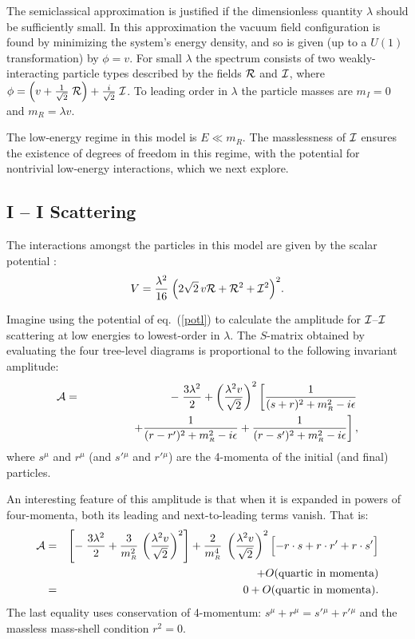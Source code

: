 \documentclass[12pt]{article}
\def\sst{\scriptscriptstyle}
\def\pref#1{(\ref{#1})}
\def\eps{\epsilon}
\def\nth#1{\frac{1}{#1}}
\begin{document}
The semiclassical approximation is justified if the dimensionless 
quantity $\lambda$ should be sufficiently small. In this approximation
the vacuum field configuration is found by minimizing the system's 
energy density, and so is given (up to a $U(1)$ transformation)
by $\phi = v$. 
For small $\lambda$ the spectrum consists of two weakly-interacting
particle types described by the fields ${\cal R}$ and ${\cal I}$,
where $\phi = \left( v + \nth{\sqrt2} \; {\cal R} \right) + 
\frac{i}{\sqrt2} \; {\cal I}$. To leading order in $\lambda$
the particle masses are $m_{\sst I} = 0$ and $m_{\sst R} 
= \lambda v$. 

The low-energy regime in this model is $E \ll m_{\sst R}$. The
masslessness of ${\cal I}$ ensures the existence of degrees of
freedom in this regime, with the potential for nontrivial
low-energy interactions, which we next explore. 

\subsection{{\cal I} -- {\cal I} Scattering}

The interactions amongst the particles in this model 
are given by the scalar potential :
%
\begin{equation}
\label{potl}
V = {\lambda^2 \over 16} \; \Bigl( 2 \sqrt2 \, v {\cal R} +
{\cal R}^2 + {\cal I}^2 \Bigr)^2. 
\end{equation}

Imagine using the potential of eq.~\pref{potl} to 
calculate the amplitude for
${\cal I}$--${\cal I}$ scattering at low energies 
to lowest-order in $\lambda$. 
The $S$-matrix obtained by evaluating the four tree-level diagrams
is proportional to the following invariant amplitude:
%
\begin{eqnarray}
\label{smatrixresult}
{\cal A} &=& - \; {3 \lambda^2 \over 2} + \left( { \lambda^2 v \over \sqrt2}
\right)^2 \left[ {1 \over (s+r)^2 + m_{\sst R}^2 - i\eps}  \right. \nonumber\\
&& \qquad\qquad \left. + {1 \over (r-r')^2 + m_{\sst R}^2 -i \eps} + 
{1 \over (r - s')^2 + m_{\sst R}^2 - i\eps}\right], 
\end{eqnarray}
%
where $s^\mu$ and $r^\mu$ (and $s'{}^\mu$ and $r'{}^\mu$)
are the 4-momenta of the initial (and final) particles.

An interesting feature of this amplitude is that when it is 
expanded in powers of four-momenta, both its leading and
next-to-leading terms vanish. That is: 
%
\begin{eqnarray}
\label{zeromomlim}
{\cal A} &=&  \left[ - \; {3 \lambda^2 \over 2} + {3 \over
m_{\sst R}^2} \, \left( { \lambda^2 v \over \sqrt2}
\right)^2 \right] + {2 \over m_{\sst R}^4} \;
\left( { \lambda^2 v \over \sqrt2} \right)^2 \Bigl[- r \cdot s
+ r \cdot r' + r \cdot s' \Bigr]  \nonumber\\
&& \qquad\qquad\qquad\qquad \qquad\qquad\qquad
+ O(\hbox{quartic in momenta}) \nonumber\\
&=& 0 +O(\hbox{quartic in momenta}) .
\end{eqnarray}
%
The last equality uses conservation of 4-momentum: $s^\mu + r^\mu
= s'{}^\mu + r'{}^\mu$ and the massless mass-shell condition
$r^2 = 0$. 
\end{document}
